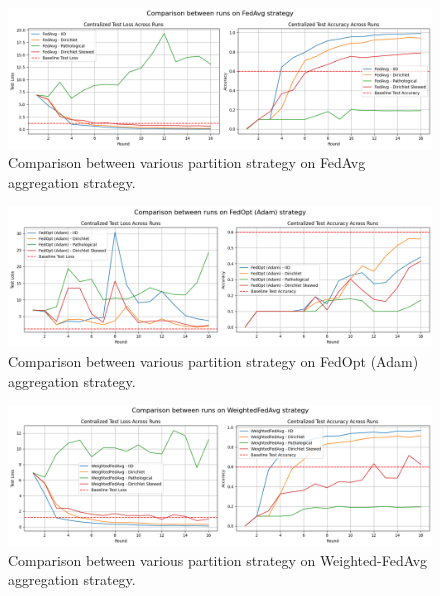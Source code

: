\documentclass[11pt]{article}
\begin{document}
    \begin{figure}[h!]
        \centering
        \includegraphics[width=1\linewidth]{img/experiment_2/fedavg-comparison}
        \caption{Comparison between various partition strategy on FedAvg aggregation strategy.}
        \label{fig:exp2-fedavg-comparison}
    \end{figure}

    \begin{figure}[h!]
        \centering
        \includegraphics[width=1\linewidth]{img/experiment_2/fedopt-comparison}
        \caption{Comparison between various partition strategy on FedOpt (Adam) aggregation strategy.}
        \label{fig:exp2-fedopt-comparison}
    \end{figure}

    \begin{figure}[h!]
        \centering
        \includegraphics[width=1\linewidth]{img/experiment_2/weightedfedavg-comparison}
        \caption{Comparison between various partition strategy on Weighted-FedAvg aggregation strategy.}
        \label{fig:exp2-weightedfedavg-comparison}
    \end{figure}
\end{document}
